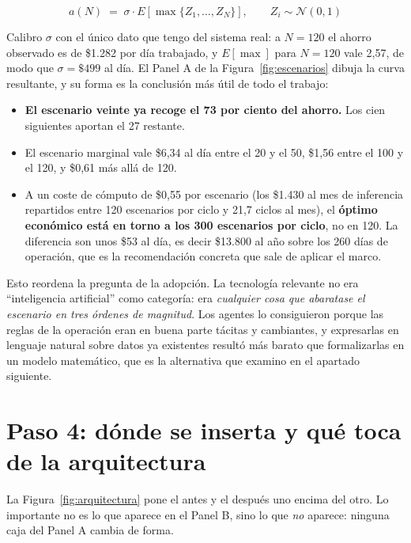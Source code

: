 \documentclass[11pt,letterpaper]{article}
\begin{document}
\begin{equation}
a(N) \;=\; \sigma \cdot E\!\left[\max\{Z_{1},\dots,Z_{N}\}\right],
\qquad Z_{i} \sim \mathcal{N}(0,1)
\label{eq:orden}
\end{equation}

Calibro $\sigma$ con el único dato que tengo del sistema real: a $N = 120$ el
ahorro observado es de \$1.282 por día trabajado, y $E[\max]$ para $N = 120$
vale 2,57, de modo que $\sigma = \$499$ al día. El Panel A de la
Figura~\ref{fig:escenarios} dibuja la curva resultante, y su forma es la
conclusión más útil de todo el trabajo:

\begin{itemize}
\item \textbf{El escenario veinte ya recoge el 73 por ciento del ahorro.} Los
  cien siguientes aportan el 27 restante.
\item El escenario marginal vale \$6,34 al día entre el 20 y el 50, \$1,56
  entre el 100 y el 120, y \$0,61 más allá de 120.
\item A un coste de cómputo de \$0,55 por escenario (los \$1.430 al mes de
  inferencia repartidos entre 120 escenarios por ciclo y 21,7 ciclos al mes),
  el \textbf{óptimo
  económico está en torno a los 300 escenarios por ciclo}, no en 120. La
  diferencia son unos \$53 al día, es decir \$13.800 al año sobre los 260 días
  de operación, que es la recomendación concreta que sale de aplicar el marco.
\end{itemize}

Esto reordena la pregunta de la adopción. La tecnología relevante no era
\enquote{inteligencia artificial} como categoría: era \emph{cualquier cosa que
abaratase el escenario en tres órdenes de magnitud}. Los agentes lo
consiguieron porque las reglas de la operación eran en buena parte tácitas y
cambiantes, y expresarlas en lenguaje natural sobre datos ya existentes
resultó más barato que formalizarlas en un modelo matemático, que es la
alternativa que examino en el apartado siguiente.

\section{Paso 4: dónde se inserta y qué toca de la arquitectura}
\label{sec:arquitectura}

La Figura~\ref{fig:arquitectura} pone el antes y el después uno encima del
otro. Lo importante no es lo que aparece en el Panel B, sino lo que
\emph{no} aparece: ninguna caja del Panel A cambia de forma.
\end{document}
